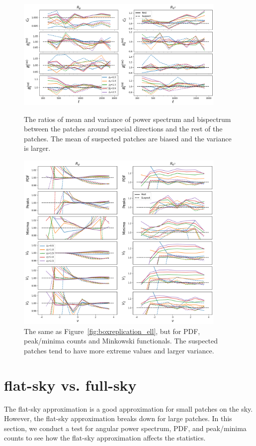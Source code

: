 \begin{figure}[p]
    \centering
    \includegraphics[width=0.9\textwidth]{figures/BR/BR_ratio_ell.png}
    \caption{The ratios of mean and variance of power spectrum and bispectrum between the patches around special directions and the rest of the patches. The mean of suspected patches are biased and the variance is larger.}
    \label{fig:boxreplication_ell}
    \includegraphics[width=0.9\textwidth]{figures/BR/BR_ratio_nu.png}
    \caption{The same as Figure~\ref{fig:boxreplication_ell}, but for PDF, peak/minima counts and Minkowski functionals. The suspected patches tend to have more extreme values and larger variance.}
    \label{fig:boxreplication_nu}
\end{figure}

\section{flat-sky vs. full-sky}
The flat-sky approximation is a good approximation for small patches on the sky. However, the flat-sky approximation breaks down for large patches. In this section, we conduct a test for angular power spectrum, PDF, and peak/minima counts to see how the flat-sky approximation affects the statistics.